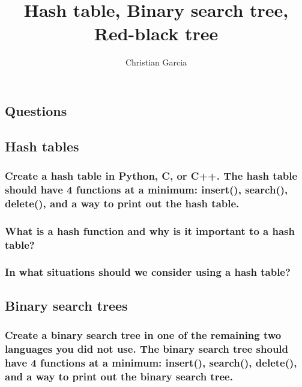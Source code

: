\documentclass{article}
\title{Hash table, Binary search tree, Red-black tree}
\author{Christian Garcia}
\begin{document}
\maketitle

\begin{Huge}
\section*{Questions}
\end{Huge}

\begin{Large}
\subsection{\textbf{Hash tables}}
\end{Large}


\subsubsection{Create a hash table in Python, C, or C++. The hash table should have 4 functions at a minimum: insert(), search(), delete(), and a way to print out the hash table.}

\vspace{24pt}

\subsubsection{What is a hash function and why is it important to a hash table?}

\vspace{108pt}

\subsubsection{In what situations should we consider using a hash table?}
\pagebreak{}

\begin{Large}
\subsection{\textbf{Binary search trees}}
\end{Large}

\subsubsection{Create a binary search tree in one of the remaining two languages you did not use. The binary search tree should have 4 functions at a minimum: insert(), search(), delete(), and a way to print out the binary search tree.}
\end{document}
